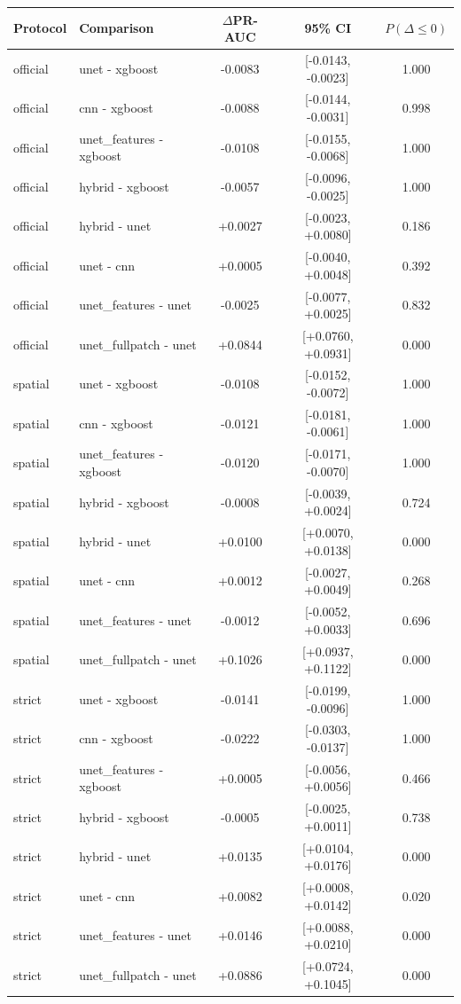 \begin{tabular}{llccc}
\toprule
Protocol & Comparison & $\Delta$PR-AUC & 95\% CI & $P(\Delta \le 0)$ \\
\midrule
official & unet - xgboost & -0.0083 & [-0.0143, -0.0023] & 1.000 \\
official & cnn - xgboost & -0.0088 & [-0.0144, -0.0031] & 0.998 \\
official & unet\_features - xgboost & -0.0108 & [-0.0155, -0.0068] & 1.000 \\
official & hybrid - xgboost & -0.0057 & [-0.0096, -0.0025] & 1.000 \\
official & hybrid - unet & +0.0027 & [-0.0023, +0.0080] & 0.186 \\
official & unet - cnn & +0.0005 & [-0.0040, +0.0048] & 0.392 \\
official & unet\_features - unet & -0.0025 & [-0.0077, +0.0025] & 0.832 \\
official & unet\_fullpatch - unet & +0.0844 & [+0.0760, +0.0931] & 0.000 \\
\midrule
spatial & unet - xgboost & -0.0108 & [-0.0152, -0.0072] & 1.000 \\
spatial & cnn - xgboost & -0.0121 & [-0.0181, -0.0061] & 1.000 \\
spatial & unet\_features - xgboost & -0.0120 & [-0.0171, -0.0070] & 1.000 \\
spatial & hybrid - xgboost & -0.0008 & [-0.0039, +0.0024] & 0.724 \\
spatial & hybrid - unet & +0.0100 & [+0.0070, +0.0138] & 0.000 \\
spatial & unet - cnn & +0.0012 & [-0.0027, +0.0049] & 0.268 \\
spatial & unet\_features - unet & -0.0012 & [-0.0052, +0.0033] & 0.696 \\
spatial & unet\_fullpatch - unet & +0.1026 & [+0.0937, +0.1122] & 0.000 \\
\midrule
strict & unet - xgboost & -0.0141 & [-0.0199, -0.0096] & 1.000 \\
strict & cnn - xgboost & -0.0222 & [-0.0303, -0.0137] & 1.000 \\
strict & unet\_features - xgboost & +0.0005 & [-0.0056, +0.0056] & 0.466 \\
strict & hybrid - xgboost & -0.0005 & [-0.0025, +0.0011] & 0.738 \\
strict & hybrid - unet & +0.0135 & [+0.0104, +0.0176] & 0.000 \\
strict & unet - cnn & +0.0082 & [+0.0008, +0.0142] & 0.020 \\
strict & unet\_features - unet & +0.0146 & [+0.0088, +0.0210] & 0.000 \\
strict & unet\_fullpatch - unet & +0.0886 & [+0.0724, +0.1045] & 0.000 \\
\bottomrule
\end{tabular}
